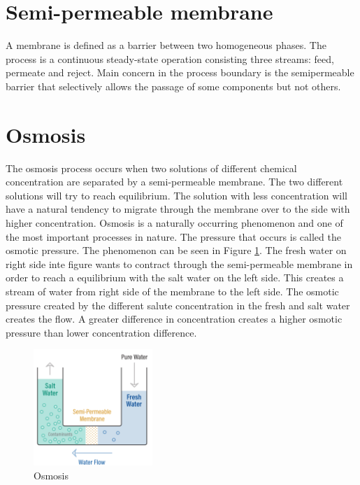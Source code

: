 
\section{Semi-permeable membrane}
\label{sec:membrane}
A membrane is defined as a barrier between two homogeneous phases. The process is a continuous steady-state operation consisting three streams: feed, permeate and reject. Main concern in the process boundary is the semipermeable barrier that selectively allows the passage of some components but not others. \cite{Singh}

\section{Osmosis} 
\label{sec:osmosis}
The osmosis process occurs when two solutions of different chemical concentration are separated by a semi-permeable membrane. The two different solutions will try to reach equilibrium. The solution with less concentration will have a natural tendency to migrate through the membrane over to the side with higher concentration.  
Osmosis is a naturally occurring phenomenon and one of the most important processes in nature. The pressure that occurs is called the osmotic pressure. The phenomenon can be seen in Figure \ref{fig:osmosis}. The fresh water on right side inte figure wants to contract through the semi-permeable membrane in order to reach a equilibrium with the salt water on the left side. This creates a stream of water from right side of the membrane to the left side. The osmotic pressure created by the different salute concentration in the fresh and salt water creates the flow. A greater difference in concentration creates a higher osmotic pressure than lower concentration difference.

\begin{figure}[h]
    \centering
    \includegraphics[width=0.4\textwidth]{Osmosis}
    \caption{Osmosis}
    \label{fig:osmosis}
\end{figure}

